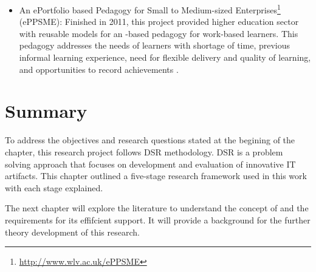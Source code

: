 \begin{itemize}
  \item An ePortfolio based Pedagogy for Small to Medium-sized
  Enterprises\footnote{\url{http://www.wlv.ac.uk/ePPSME}} (ePPSME): Finished
  in 2011, this project provided higher education sector with reusable models
  for an \ep-based pedagogy for work-based learners. This pedagogy addresses
  the needs of learners with shortage of time, previous informal learning
  experience, need for flexible delivery and quality of learning, and
  opportunities to record achievements \citep{Felce2011}.
\end{itemize}

\section{Summary}

To address the objectives and research questions stated at the begining of the
chapter, this research project follows DSR methodology. DSR is a problem solving
approach that focuses on development and evaluation of innovative IT artifacts.
This chapter outlined a five-stage research framework used in this work with
each stage explained.

The next chapter will explore the literature to understand the concept of \LLLs
and the requirements for its effifcient support. It will provide a background
for the further theory development of this research.
